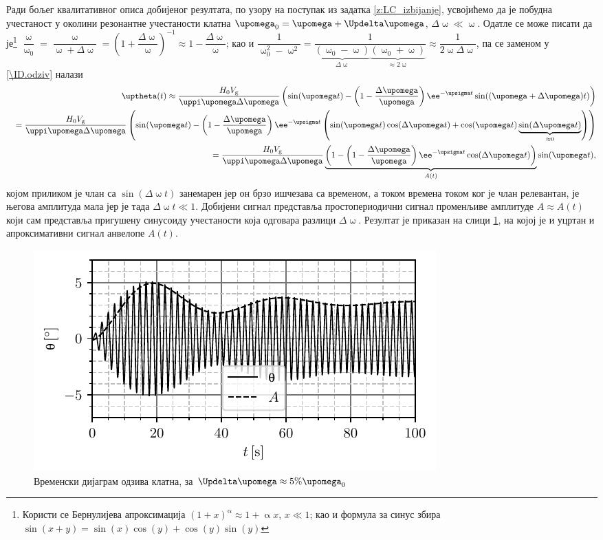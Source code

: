 Ради бољег квалитативног описа добијеног резултата, по узору на поступак из задатка \ref{z:LC_izbijanje}, усвојићемо  
да је побудна учестаност у околини резонантне учестаности клатна 
$\upomega_0 = \upomega + \Updelta\upomega$, $\Delta \upomega \ll \upomega$. Одатле се може писати да је\footnote{
    Користи се Бернулијева апроксимација $(1+x)^\upalpha \approx 1 + \upalpha x$, $x \ll 1$; као и формула за синус збира
    $\sin(x+y) = \sin(x)\cos(y) + \cos(y)\sin(y)$
}
$
\dfrac{\upomega}{\upomega_0} = \dfrac{\upomega}{\upomega + \Delta \upomega} = \left(1 + \dfrac{\Delta \upomega}{\upomega} \right)^{-1} \approx 
1 - \dfrac{\Delta \upomega}{\upomega}$; као и 
$
\dfrac{1}{\upomega_0^2 - \upomega^2} = 
\dfrac{1}{\underbrace{(\upomega_0 - \upomega)}_{\Delta\upomega} \underbrace{(\upomega_0 + \upomega)}_{\approx 2\upomega} } \approx 
\dfrac{1}{2\upomega \Delta \upomega}
$, па се заменом у \eqref{\ID.odziv} налази 
\begin{eqnarray}
    && \uptheta(t) \approx \dfrac{H_0 V_{\rm g}}{\uppi \upomega \Delta \upomega}
    \left(
        \sin(\upomega t )
        -
        \left(1 - \dfrac{\Delta \upomega}{\upomega}\right) \ee^{-\upsigma t} \sin( (\upomega + \Delta \upomega) t )
    \right) \\
    &&=
    \dfrac{H_0 V_{\rm g}}{\uppi \upomega \Delta \upomega}
    \left(
        \sin(\upomega t )
        -
        \left(1 - \dfrac{\Delta \upomega}{\upomega}\right) \ee^{-\upsigma t} 
        \left(
            \sin( \upomega t )  \cos(\Delta \upomega t ) + \cos( \upomega t )  \underbrace{\sin(\Delta \upomega t ) }_{\approx 0}
        \right)
    \right)\\ 
    &&=
    \dfrac{H_0 V_{\rm g}}{\uppi \upomega \Delta \upomega}
        \underbrace{\left(
            1 - \left(1 - \dfrac{\Delta \upomega}{\upomega}\right) \ee^{-\upsigma t} \cos(\Delta \upomega t ) 
        \right)}_{A(t)} \sin(\upomega t),
\end{eqnarray}
којом приликом је члан са $\sin(\Delta\upomega t)$ занемарен јер он брзо ишчезава са временом, а током времена током ког је члан релевантан, 
је његова амплитуда мала јер је тада $\Delta \upomega t \ll 1$. Добијени сигнал представља простопериодични сигнал променљиве амплитуде 
$A \approx A(t)$ 
који сам представља пригушену синусоиду учестаности која одговара разлици $\Delta \upomega$. Резултат је приказан на слици \ref{\ID.res}, 
на којој је и уцртан и апроксимативни сигнал анвелопе $A(t)$.

\begin{figure}[ht!]
    \centering
    \includegraphics{fig/klatno_plot.pdf}
    \caption{Временски дијаграм одзива клатна, за $\Updelta \upomega \approx 5\% \upomega_0$}
    \label{\ID.res}
\end{figure}